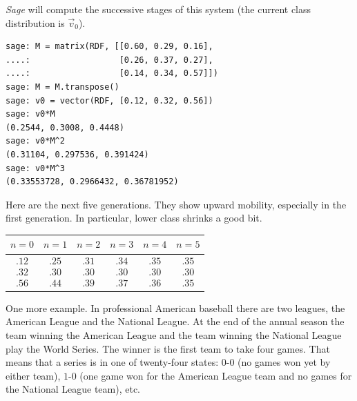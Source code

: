 \textit{Sage} will compute the successive stages of this system
(the current class distribution is $\vec{v}_0$).
\begin{lstlisting}
sage: M = matrix(RDF, [[0.60, 0.29, 0.16],
....:                  [0.26, 0.37, 0.27],
....:                  [0.14, 0.34, 0.57]])
sage: M = M.transpose()
sage: v0 = vector(RDF, [0.12, 0.32, 0.56])
sage: v0*M
(0.2544, 0.3008, 0.4448)
sage: v0*M^2
(0.31104, 0.297536, 0.391424)
sage: v0*M^3
(0.33553728, 0.2966432, 0.36781952)  
\end{lstlisting}
Here are the next five generations.
They show upward mobility, especially in the 
first generation.
In particular, lower class shrinks a good bit.
\begin{center}
  \begin{tabular}{c|ccccc}
    $n=0$  &$n=1$  &$n=2$  &$n=3$  &$n=4$  &$n=5$  \\ \hline
    $\begin{array}{l}
               .12 \\ .32  \\ .56
      \end{array}$
    &$\begin{array}{l}
               .25 \\ .30  \\ .44
       \end{array}$
    &$\begin{array}{l}
               .31 \\ .30  \\ .39  
       \end{array}$
    &$\begin{array}{l}
               .34 \\ .30  \\ .37  
       \end{array}$
    &$\begin{array}{l}
               .35 \\ .30 \\ .36  
       \end{array}$
    &$\begin{array}{l}
               .35 \\ .30  \\ .35  
       \end{array}$
  \end{tabular}
\end{center}

One more example.
In professional American baseball there are two leagues, the
American League and the National League.
At the end of the annual season 
the team winning the American League
and the team winning the National League play the World Series.
The winner is the first team to take four games.
That means that a series is in one of twenty-four states: 
$0$-$0$ (no games won yet by either team), 
$1$-$0$ (one game won for the American League
team and no games for the National League team), etc.

